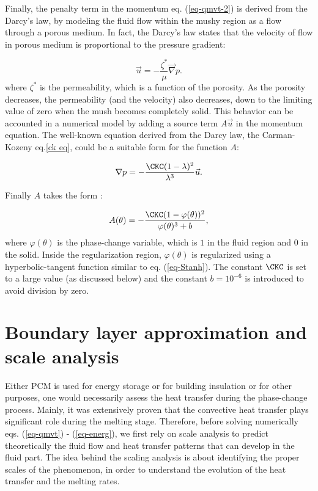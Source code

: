 Finally, the penalty term in the momentum eq. (\ref{eq-qmvt-2}) is derived from the Darcy's law, by modeling the fluid flow within the mushy region as a flow through a porous medium.
In fact, the Darcy's law states that the velocity of flow in porous medium is proportional to the pressure gradient:

\begin{equation}
	\vec u = - \frac{\zeta^*}{\mu} \vec \nabla p.
\end{equation}
where $\zeta^*$ is the permeability, which is a function of the porosity.
As the porosity decreases, the permeability (and the velocity) also decreases, down to the limiting value of zero when the mush becomes completely solid.
This behavior can be accounted in a numerical model by adding a source term $A \vec u$ in the momentum equation.
The well-known equation derived from the Darcy law, the Carman-Kozeny eq.\ref{ck eq}, could be a suitable form for the function $A$:

\begin{equation} \label{ck eq}
	\nabla p = - \frac{\CKC (1 - \lambda)^2}{\lambda^3} \vec u.
\end{equation}

Finally $A$ takes the form \citep{Belhamadia2012,kheirabadi2015effect}:

\begin{equation}\label{eq-CK}
A(\theta) = -\frac{\CKC (1 - \varphi(\theta))^2}{\varphi(\theta)^3 + b},
\end{equation}
where $\varphi(\theta)$ is the phase-change variable, which is  $1$ in the fluid region and $0$ in the solid. Inside the regularization region,  $\varphi(\theta)$ is regularized using a hyperbolic-tangent function similar to eq. (\ref{eq-Stanh}).
The constant $\CKC$ is set to a  large value (as discussed below) and  the constant $b=10^{-6}$ is introduced to avoid division by zero.

\section{Boundary layer approximation and scale analysis} \label{sec-bound-scal-anal}
Either PCM is used for energy storage or for building insulation or for other purposes, one would necessarily assess the heat transfer during the phase-change process.
Mainly, it was extensively proven that the convective heat transfer plays significant role during the melting stage.
Therefore, before solving numerically eqs. (\ref{eq-qmvt}) - (\ref{eq-energ}), we first rely on scale analysis to predict theoretically the fluid flow and heat transfer patterns that can develop in the fluid part.
The idea behind the scaling analysis is about identifying the proper scales of the phenomenon, in order to understand the evolution of the heat transfer and the melting rates.

